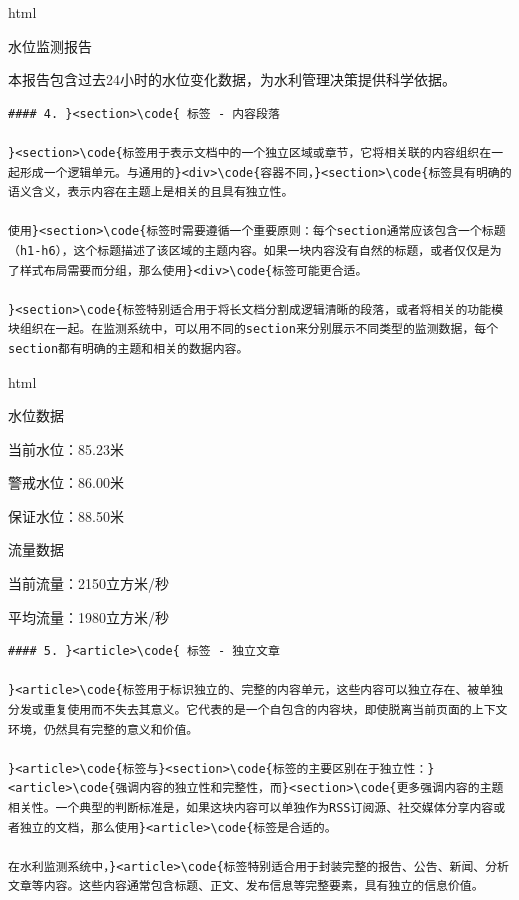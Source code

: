html

水位监测报告

本报告包含过去24小时的水位变化数据，为水利管理决策提供科学依据。

\begin{lstlisting}
#### 4. }<section>\code{ 标签 - 内容段落

}<section>\code{标签用于表示文档中的一个独立区域或章节，它将相关联的内容组织在一起形成一个逻辑单元。与通用的}<div>\code{容器不同，}<section>\code{标签具有明确的语义含义，表示内容在主题上是相关的且具有独立性。

使用}<section>\code{标签时需要遵循一个重要原则：每个section通常应该包含一个标题（h1-h6），这个标题描述了该区域的主题内容。如果一块内容没有自然的标题，或者仅仅是为了样式布局需要而分组，那么使用}<div>\code{标签可能更合适。

}<section>\code{标签特别适合用于将长文档分割成逻辑清晰的段落，或者将相关的功能模块组织在一起。在监测系统中，可以用不同的section来分别展示不同类型的监测数据，每个section都有明确的主题和相关的数据内容。

\end{lstlisting}

html

水位数据

当前水位：85.23米

警戒水位：86.00米

保证水位：88.50米

流量数据

当前流量：2150立方米/秒

平均流量：1980立方米/秒

\begin{lstlisting}
#### 5. }<article>\code{ 标签 - 独立文章

}<article>\code{标签用于标识独立的、完整的内容单元，这些内容可以独立存在、被单独分发或重复使用而不失去其意义。它代表的是一个自包含的内容块，即使脱离当前页面的上下文环境，仍然具有完整的意义和价值。

}<article>\code{标签与}<section>\code{标签的主要区别在于独立性：}<article>\code{强调内容的独立性和完整性，而}<section>\code{更多强调内容的主题相关性。一个典型的判断标准是，如果这块内容可以单独作为RSS订阅源、社交媒体分享内容或者独立的文档，那么使用}<article>\code{标签是合适的。

在水利监测系统中，}<article>\code{标签特别适合用于封装完整的报告、公告、新闻、分析文章等内容。这些内容通常包含标题、正文、发布信息等完整要素，具有独立的信息价值。

\end{lstlisting}

